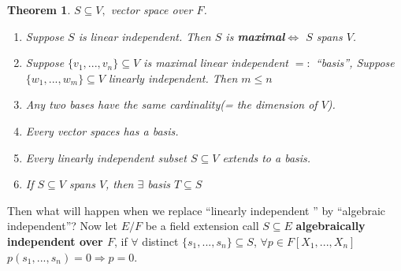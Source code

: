 \documentclass[11pt]{article}
\newtheorem{thm}{Theorem}[section]
\newcommand{\Lrta}{\Longrightarrow}
\newcommand{\Llrta}{\Longleftrightarrow}
\begin{document}
\begin{thm}
$S\subseteq V,$ vector space over $F$. 
\begin{enumerate}[label=(\alph*)]
\item Suppose $S$ is linear independent. Then $S$ is \textbf{maximal}$\Llrta$ $S$ spans $V$.
\item Suppose $\{v_1,...,v_n\}\subseteq V$ is maximal linear independent $=:$ ``basis'', Suppose $\{w_1,...,w_m\}\subseteq V$ linearly independent. Then $m\leq n$
\item  Any two bases have the same cardinality(= the dimension of $V$).
\item Every vector spaces has a basis.
\item Every linearly independent subset $S\subseteq V$ extends to a basis.
\item If $S\subseteq V$ spans $V$, then $\exists $ basis $T\subseteq S$
\end{enumerate}
\end{thm}

Then what will happen when we replace ``linearly independent '' by ``algebraic independent''?
Now let $E/F$ be a field extension call $S\subseteq E$ \textbf{algebraically independent over $F$}, if $\forall $ distinct $\{s_1,...,s_n\}\subseteq S$, $\forall p\in F[X_1,...,X_n]$ $p(s_1,...,s_n)=0\Lrta p=0$.
\end{document}
